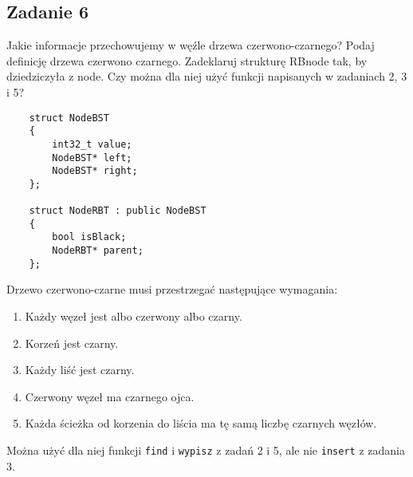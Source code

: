 \documentclass{article}
\begin{document}
\subsection*{Zadanie 6}
Jakie informacje przechowujemy w węźle drzewa czerwono-czarnego? Podaj definicję drzewa
czerwono czarnego. Zadeklaruj strukturę RBnode tak, by dziedziczyła z node. Czy można dla niej użyć funkcji napisanych
w zadaniach 2, 3 i 5?
\begin{lstlisting}
    struct NodeBST
    {
        int32_t value;
        NodeBST* left;
        NodeBST* right;  
    };

    struct NodeRBT : public NodeBST
    {
        bool isBlack;
        NodeRBT* parent;
    };
\end{lstlisting}
Drzewo czerwono-czarne musi przestrzegać następujące wymagania:
\begin{enumerate}
    \item Każdy węzeł jest albo czerwony albo czarny.
    \item Korzeń jest czarny.
    \item Każdy liść jest czarny.
    \item Czerwony węzeł ma czarnego ojca.
    \item Każda ścieżka od korzenia do liścia ma tę samą liczbę czarnych węzłów.
\end{enumerate}
Można użyć dla niej funkcji \verb|find| i \verb|wypisz| z zadań 2 i 5, ale nie \verb|insert| z zadania 3.
\end{document}

